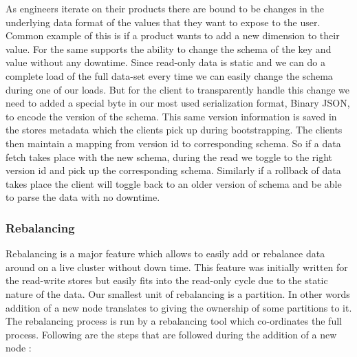 \documentclass[10pt,twocolumn,preprint,nonatbib,numbers]{sigplanconf}
\begin{document}
As engineers iterate on their products there are bound to be changes in the underlying data format of the values that they want to expose to the user. Common example of this is if a product wants to add a new dimension to their value. For the same \projectname{} supports the ability to change the schema of the key and value without any downtime. Since read-only data is static and we can do a complete load of the full data-set every time we can easily change the schema during one of our loads. But for the client to transparently handle this change we need to added a special byte in our most used serialization format, Binary JSON, to encode the version of the schema. This same version information is saved in the stores metadata which the clients pick up during bootstrapping. The clients then maintain a mapping from version id to corresponding schema. So if a data fetch takes place with the new schema, during the read we toggle to the right version id and pick up the corresponding schema. Similarly if a rollback of data takes place the client will toggle back to an older version of schema and be able to parse the data with no downtime. 


\subsubsection{Rebalancing}
\label{sec:read_only:data_cycle:rebalancing}

Rebalancing is a major feature which allows \projectname{} to easily add or rebalance data around on a live cluster without down time. This feature was initially written for the read-write stores but easily fits into the read-only cycle due to the static nature of the data. Our smallest unit of rebalancing is a partition. In other words addition of a new node translates to giving the ownership of some partitions to it. The rebalancing process is run by a rebalancing tool which co-ordinates the full process. Following are the steps that are followed during the addition of a new node :
\end{document}
